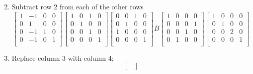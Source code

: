\documentclass[12pt]{article}
\makeatletter
\theoremstyle{homework}
\newenvironment{exercise}[1]
{\def\@currentlabel{#1}\exercisecore}
{\endexercisecore}
\makeatother
\begin{document}
\begin{exercise}{4}
\begin{enumerate}
\begin{equation*}
        \end{equation*}
        \item Subtract row 2 from each of the other rows
        \begin{equation*}
            \begin{bmatrix}
                1 & -1 & 0 & 0\\
                0 & 1 & 0 & 0\\
                0 & -1 & 1 & 0\\
                0 & -1 & 0 & 1\\
            \end{bmatrix}
            \begin{bmatrix}
                1 & 0 & 1 & 0\\
                0 & 1 & 0 & 0\\
                0 & 0 & 1 & 0\\
                0 & 0 & 0 & 1\\
            \end{bmatrix}
            \begin{bmatrix}
                0 & 0 & 1 & 0\\
                0 & 1 & 0 & 0\\
                1 & 0 & 0 & 0\\
                0 & 0 & 0 & 1\\
            \end{bmatrix}
            B
            \begin{bmatrix}
                1 & 0 & 0 & 0\\
                0 & 0 & 0 & 1\\
                0 & 0 & 1 & 0\\
                0 & 1 & 0 & 0\\
            \end{bmatrix}
            \begin{bmatrix}
                1 & 0 & 0 & 0\\
                0 & 1 & 0 & 0\\
                0 & 0 & 2 & 0\\
                0 & 0 & 0 & 1\\
            \end{bmatrix}
        \end{equation*}
        \item Replace column 3 with column 4;
        \begin{equation*}
            \begin{bmatrix}

\end{bmatrix}
\end{equation*}
\end{enumerate}
\end{exercise}
\end{document}
